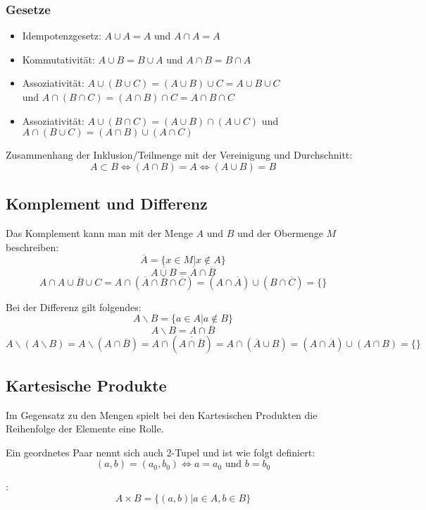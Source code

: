 \subsubsection{Gesetze}
\begin{itemize}
  \item Idempotenzgesetz: $A \cup A = A$ und $A \cap A = A$
  \item Kommutativität: $A \cup B = B \cup A$ und $A \cap B = B \cap A$
  \item Assoziativität: $A \cup (B \cup C) = (A \cup B) \cup C = A \cup
  B \cup C$ \\ und $A \cap (B \cap C) = (A \cap B) \cap C = A \cap B \cap C$
  \item Assoziativität: $A \cup (B \cap C) = (A \cup B) \cap (A \cup C)$
    und $A \cap (B \cup C) = (A \cap B) \cup (A \cap C)$
\end{itemize}
Zusammenhang der Inklusion/Teilmenge mit der Vereinigung und Durchschnitt:
\[ A \subset B \Leftrightarrow (A \cap B) = A \Leftrightarrow (A \cup B)
= B \]

\subsection{Komplement und Differenz}
Das Komplement kann man mit der Menge $A$ und $B$ und der Obermenge $M$
beschreiben:
\[\overline A = \{ x \in M | x \notin A\} \]
\[ \overline{A \cup B} = \overline A \cap \overline B \]
\[ A \cap \overline{A \cup B \cup C} = A \cap (\overline A \cap
  \overline B \cap \overline C) = (A \cap \overline A) \cup (B \cap
  \overline C) = \{\}\]

Bei der Differenz gilt folgendes:
\[ A \backslash B = \{ a \in A | a \notin B \}\]
\[ A \backslash B = A \cap \overline B \]
\[ A \backslash (A \backslash B) = A \backslash (A \cap \overline B) = A
  \cap (\overline{A \cap \overline B}) = A \cap (\overline A \cup B) = (A
  \cap \overline A) \cup (A \cap B) = \{\}\]

\subsection{Kartesische Produkte}
Im Gegensatz zu den Mengen spielt bei den Kartesischen Produkten die
Reihenfolge der Elemente eine Rolle.

Ein geordnetes Paar nennt sich auch 2-Tupel und ist wie folgt definiert:
\[ (a, b) = (a_0, b_0) \Leftrightarrow a = a_0 \text{ und } b = b_0 \]

:
\[ A \times B = \{(a,b)|a \in A, b \in B \}\]


